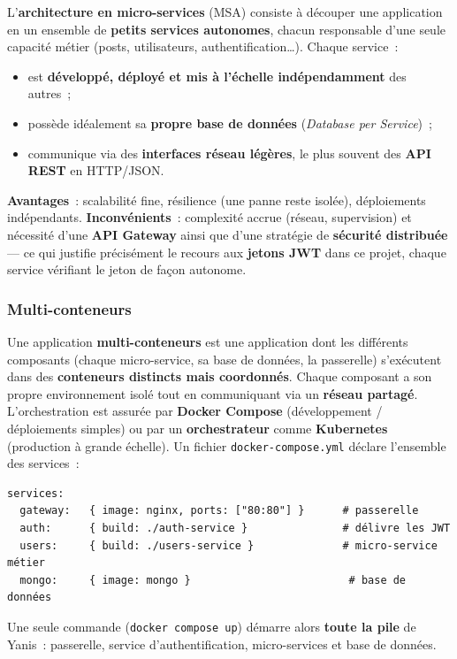 \noindent L'\textbf{architecture en micro-services} (MSA) consiste à découper une application en un ensemble de \textbf{petits services autonomes}, chacun responsable d'une seule capacité métier (posts, utilisateurs, authentification…). Chaque service~:
\begin{itemize}
	\item est \textbf{développé, déployé et mis à l'échelle indépendamment} des autres~;
	\item possède idéalement sa \textbf{propre base de données} (\textit{Database per Service})~;
	\item communique via des \textbf{interfaces réseau légères}, le plus souvent des \textbf{API REST} en HTTP/JSON.
\end{itemize}
\noindent \textbf{Avantages}~: scalabilité fine, résilience (une panne reste isolée), déploiements indépendants. \textbf{Inconvénients}~: complexité accrue (réseau, supervision) et nécessité d'une \textbf{API Gateway} ainsi que d'une stratégie de \textbf{sécurité distribuée} — ce qui justifie précisément le recours aux \textbf{jetons JWT} dans ce projet, chaque service vérifiant le jeton de façon autonome.

\vspace{0.4cm}

\subsubsection*{Multi-conteneurs}
{}

\noindent Une application \textbf{multi-conteneurs} est une application dont les différents composants (chaque micro-service, sa base de données, la passerelle) s'exécutent dans des \textbf{conteneurs distincts mais coordonnés}. Chaque composant a son propre environnement isolé tout en communiquant via un \textbf{réseau partagé}. L'orchestration est assurée par \textbf{Docker Compose} (développement / déploiements simples) ou par un \textbf{orchestrateur} comme \textbf{Kubernetes} (production à grande échelle). Un fichier \texttt{docker-compose.yml} déclare l'ensemble des services~:
\begin{verbatim}
services:
  gateway:   { image: nginx, ports: ["80:80"] }      # passerelle
  auth:      { build: ./auth-service }               # délivre les JWT
  users:     { build: ./users-service }              # micro-service métier
  mongo:     { image: mongo }                         # base de données
\end{verbatim}
\noindent Une seule commande (\texttt{docker compose up}) démarre alors \textbf{toute la pile} de Yanis~: passerelle, service d'authentification, micro-services et base de données.

